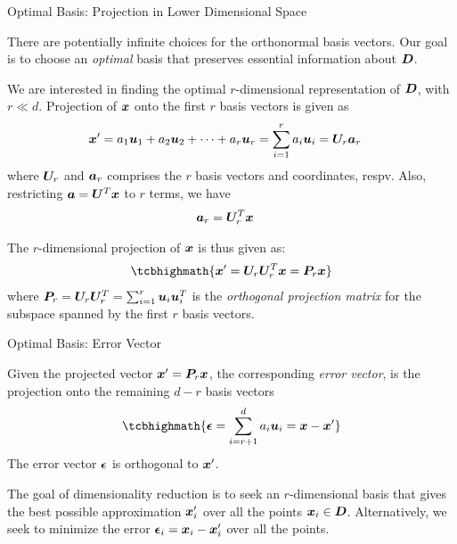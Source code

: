 \begin{frame}{Optimal Basis: Projection in Lower Dimensional Space}

There are potentially inf\/{i}nite choices for the
 orthonormal
basis vectors. Our goal is to choose an 
{\em optimal} basis that preserves essential information about ${\boldsymbol D}$.

\medskip
We are interested in f\/{i}nding the
optimal $r$-dimensional representation
of ${\boldsymbol D}$, with $r \ll d$.
Projection of ${\boldsymbol x}$ onto the f\/{i}rst $r$
basis vectors is given as
\begin{align*}
    {\boldsymbol x}' & = a_1 {\boldsymbol u}_1 + a_2 {\boldsymbol u}_2 + \cdots + a_r {\boldsymbol u}_r =
    \sum_{i=1}^r a_i {\boldsymbol u}_i
	= {\boldsymbol U}_r {\boldsymbol a}_r
\end{align*}
where ${\boldsymbol U}_r$ and ${\boldsymbol a}_r$ comprises the $r$ basis vectors and
coordinates, respv. 
Also, restricting ${\boldsymbol a} = {\boldsymbol U}^T {\boldsymbol x}$ to $r$ terms, we have
\begin{align*}	
{\boldsymbol a}_r & = {\boldsymbol U}_r^T {\boldsymbol x}
\end{align*}


\medskip
The $r$-dimensional projection of ${\boldsymbol x}$ is thus given as:
\begin{align*}
\tcbhighmath{
    \bx' = \bU_r\bU_r^T \bx = \bP_r \bx
}
\end{align*}
where ${\boldsymbol P}_r = {\boldsymbol U}_r {\boldsymbol U}_r^T = \sum_{i=1}^r {\boldsymbol u}_i {\boldsymbol u}_i^T$ is the {\em
orthogonal projection
matrix} for the subspace spanned by the f\/{i}rst $r$ basis vectors.

\end{frame}


\begin{frame}{Optimal Basis: Error Vector}

Given the projected vector ${\boldsymbol x}' = {\boldsymbol P}_r {\boldsymbol x}$, the corresponding
{\em error vector}, is the projection onto the remaining $d-r$ basis
vectors
\begin{align*}
\tcbhighmath{
    \bepsilon = \sum_{i=r+1}^d a_i \bu_i = \bx - \bx'
}
\end{align*}
The error vector ${\bm \epsilon}$ is orthogonal to ${\boldsymbol x}'$.


\medskip
The goal of dimensionality reduction is to
seek an $r$-dimensional basis that gives the best
possible approximation ${\boldsymbol x}_i'$
over all the points ${\boldsymbol x}_i \in {\boldsymbol D}$.
Alternatively, we seek to minimize the error ${\bm \epsilon}_i =
{\boldsymbol x}_i - {\boldsymbol x}_i'$ over all the points.
\end{frame}




